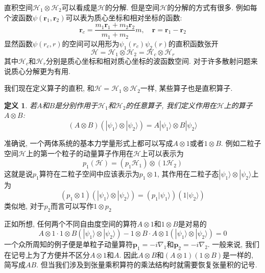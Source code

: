 \documentclass[a4paper,11pt]{book}
\newtheorem{definition}{\hspace{2em}定义}[section]
\begin{document}
直积空间$\mathcal{H}_1\otimes\mathcal{H}_2$可以看成是$\mathcal{H}$的分解. 但是空间$\mathcal{H}$的分解的方式有很多. 例如每个波函数$\psi(\mathbf{r}_1,\mathbf{r}_2)$可以表为质心坐标和相对坐标的函数:
\begin{equation*}
  \mathbf{r}_c=\frac{m_1\mathbf{r}_1+m_2\mathbf{r}_2}{m_1+m_2}m,\quad \mathbf{r}=\mathbf{r}_1-\mathbf{r}_2
\end{equation*}
显然函数$\psi(r_c,r)$的空间可以用形为$\psi_1(r_c)\psi_2(r)$的直积函数张开
\begin{equation*}
  \mathcal{H}=\mathcal{H}_1\otimes\mathcal{H}_2=\mathcal{H}_{c}\otimes\mathcal{H}_{r}
\end{equation*}
其中$\mathcal{H}_c$和$\mathcal{H}_r$分别是质心坐标和相对质心坐标的波函数空间. 对于许多散射问题来说质心分解更为有用.

我们现在定义算子的直积, 和$\mathcal{H}=\mathcal{H}_1\otimes\mathcal{H}_2$一样, 某些算子也是直积算子.
\begin{definition}
  若$A$和$B$是分别作用于$\mathcal{H}_1$和$\mathcal{H}_2$的任意算子, 我们定义作用在$\mathcal{H}$上的算子$A\otimes B$:
  \begin{equation*}
    (A\otimes B)(|\psi_1\rangle\otimes|\psi_2\rangle)=A|\psi_1\rangle\otimes B|\psi_2\rangle
  \end{equation*}
\end{definition}
准确说, 一个两体系统的基本力学量形式上都可以写成$A\otimes1$或者$1\otimes B$. 例如二粒子空间$\mathcal{H}$上的第一个粒子的动量算子作用在$\mathcal{H}$上可以表示为
\begin{equation*}
  p_1(\mathcal{H})=(p_1\mathcal{H}_1)\otimes(1\mathcal{H}_2)
\end{equation*}
这就是说$p_1$算符在二粒子空间中应该表示为$p_1\otimes1$, 其作用在二粒子态$|\psi_1\rangle\otimes|\psi_2\rangle$上为
\begin{equation*}
  (p_1\otimes1)(|\psi_1\rangle\otimes|\psi_2\rangle)=(p_1|\psi_1\rangle)(1|\psi_2\rangle)
\end{equation*}
类似地, 对于$p_2$而言可以写作$1\otimes p_2$

正如所想, 任何两个不同自由度空间的算符$A\otimes1$和$1\otimes B$是对易的
\begin{equation*}
  A\otimes1\cdot1\otimes B(|\psi_1\rangle\otimes|\psi_2\rangle)-1\otimes B\cdot A\otimes1(|\psi_1\rangle\otimes|\psi_2\rangle)=0
\end{equation*}
一个众所周知的例子便是单粒子动量算符$\mathbf{p}_1=-i\nabla_1$和$\mathbf{p}_2=-i\nabla_2$. 一般来说, 我们在记号上为了方便并不区分$A\otimes1$和$A$. 因此$A\otimes B$和$(A\otimes1)(1\otimes B)$是一样的, 简写成$AB$. 但当我们涉及到张量乘积算符的乘法结构时就需要恢复张量积的记号.
\end{document}
